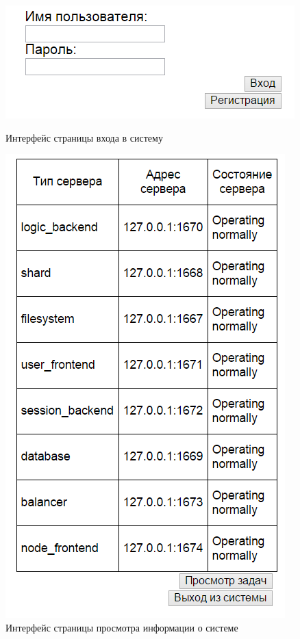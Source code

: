\documentclass[a4paper,12pt]{report}
\numberwithin{equation}{section}
\begin{document}
  \begin{figure}
    \centering
    \begin{minipage}{.49\linewidth}
      \centering
      \includegraphics[width=\linewidth]{img/interface/login}
      \caption{Интерфейс страницы входа в систему}
      \label{fig:interface-login}
    \end{minipage}
    \hfill
    \begin{minipage}{.49\linewidth}
      \centering
      \includegraphics[width=\linewidth]{img/interface/system}
      \caption{Интерфейс страницы просмотра информации о системе}
      \label{fig:interface-system}
    \end{minipage}  
  \end{figure}
  
\end{document}
